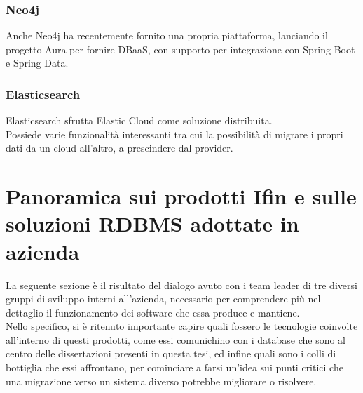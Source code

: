 \subsubsection{Neo4j}
Anche Neo4j ha recentemente fornito una propria piattaforma, lanciando il progetto Aura per fornire DBaaS, con supporto per integrazione con Spring Boot e Spring Data.

\subsubsection{Elasticsearch}
Elasticsearch sfrutta Elastic Cloud come soluzione distribuita.\\
Possiede varie funzionalità interessanti tra cui la possibilità di migrare i propri dati da un cloud all'altro, a prescindere dal provider.


\section{Panoramica sui prodotti Ifin e sulle soluzioni RDBMS adottate in azienda}

La seguente sezione è il risultato del dialogo avuto con i team leader di tre diversi gruppi di sviluppo interni all'azienda, necessario per comprendere più nel dettaglio il funzionamento dei software che essa produce e mantiene.\\
Nello specifico, si è ritenuto importante capire quali fossero le tecnologie coinvolte all'interno di questi prodotti, come essi comunichino con i database che sono al centro delle dissertazioni presenti in questa tesi, ed infine quali sono i colli di bottiglia che essi affrontano, per cominciare a farsi un'idea sui punti critici che una migrazione verso un sistema diverso potrebbe migliorare o risolvere.\\

